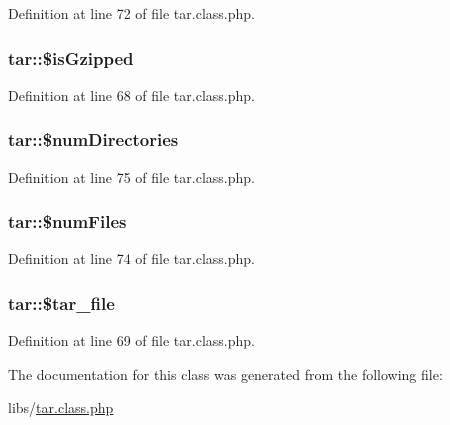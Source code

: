 Definition at line 72 of file tar.\+class.\+php.

\subsubsection[{\texorpdfstring{\$is\+Gzipped}{$isGzipped}}]{\setlength{\rightskip}{0pt plus 5cm}tar\+::\$is\+Gzipped}\hypertarget{classtar_a82771381c948bca4c166212276fe4b46}{}\label{classtar_a82771381c948bca4c166212276fe4b46}


Definition at line 68 of file tar.\+class.\+php.

\subsubsection[{\texorpdfstring{\$num\+Directories}{$numDirectories}}]{\setlength{\rightskip}{0pt plus 5cm}tar\+::\$num\+Directories}\hypertarget{classtar_a2406f376692c41ad3e3a62cf473738ec}{}\label{classtar_a2406f376692c41ad3e3a62cf473738ec}


Definition at line 75 of file tar.\+class.\+php.

\subsubsection[{\texorpdfstring{\$num\+Files}{$numFiles}}]{\setlength{\rightskip}{0pt plus 5cm}tar\+::\$num\+Files}\hypertarget{classtar_a03d688d94a5fa92720ff9b1c03e7c157}{}\label{classtar_a03d688d94a5fa92720ff9b1c03e7c157}


Definition at line 74 of file tar.\+class.\+php.

\subsubsection[{\texorpdfstring{\$tar\+\_\+file}{$tar_file}}]{\setlength{\rightskip}{0pt plus 5cm}tar\+::\$tar\+\_\+file}\hypertarget{classtar_afea782413237d583b7611a1c5410f2c5}{}\label{classtar_afea782413237d583b7611a1c5410f2c5}


Definition at line 69 of file tar.\+class.\+php.



The documentation for this class was generated from the following file\+:\begin{DoxyCompactItemize}
\item 
libs/\hyperlink{tar_8class_8php}{tar.\+class.\+php}\end{DoxyCompactItemize}

